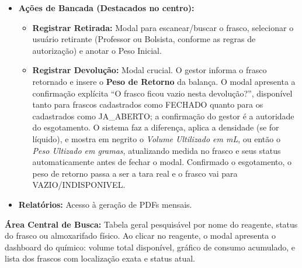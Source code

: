 \begin{itemize}
\begin{itemize}
        \item Imprimir Etiquetas: Modal bifurcado em duas abas. A Aba 1 (Novos Frascos / Virgens) oferece opções de intervalo (a partir do último cadastrado, após última impressão ou personalizado) e um Grid Visual de Offset 3×10 para escolha da célula inicial. A Aba 2 (Frascos Cadastrados / 2ª Via) permite busca por reagente/código e seleção de até 10 frascos, gerando a respectiva Ficha de Conferência.

    \end{itemize}
    \item \textbf{Ações de Bancada (Destacados no centro):}
    \begin{itemize}
        \item \textbf{Registrar Retirada:} Modal para escanear/buscar o frasco, selecionar o usuário retirante (Professor ou Bolsista, conforme as regras de autorização) e anotar o Peso Inicial.
        \item \textbf{Registrar Devolução:} Modal crucial. O gestor informa o frasco retornado e insere o \textbf{Peso de Retorno} da balança. O modal apresenta a confirmação explícita ``O frasco ficou vazio nesta devolução?'', disponível tanto para frascos cadastrados como FECHADO quanto para os cadastrados como JA\_ABERTO; a confirmação do gestor é a autoridade do esgotamento. O sistema faz a diferença, aplica a densidade (se for líquido), e mostra em negrito o \textit{Volume Ultilizado em mL}, ou então o \textit{Peso Ultizado em gramas}, atualizando medida no frasco e seus status automaticamente antes de fechar o modal. Confirmado o esgotamento, o peso de retorno passa a ser a tara real e o frasco vai para VAZIO/INDISPONIVEL.
    \end{itemize}
    \item \textbf{Relatórios:} Acesso à geração de PDFs mensais.
\end{itemize}
\textbf{Área Central de Busca:} Tabela geral pesquisável por nome do reagente, status do frasco ou almoxarifado físico. Ao clicar no reagente, o modal apresenta o dashboard do químico: volume total disponível, gráfico de consumo acumulado, e lista dos frascos com localização exata e status atual.

